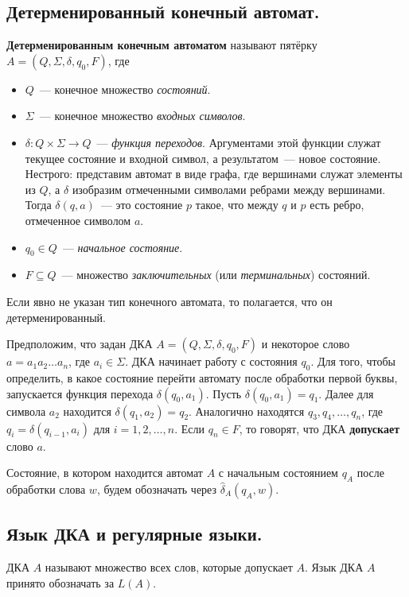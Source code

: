 \documentclass[a4paper,12pt]{article}
\begin{document}
	\subsection{Детерменированный конечный автомат.}
	\textbf{Детерменированным конечным автоматом} называют пятёрку \(A = (Q, \Sigma, \delta, q_0, F)\), где 
	\begin{itemize}
		\item \(Q\)~--- конечное множество \textit{состояний}.
		\item \(\Sigma\)~--- конечное множество \textit{входных символов}.
		\item \(\delta : Q \times \Sigma \to Q\)~--- \textit{функция переходов}. Аргументами этой функции служат текущее состояние и входной символ, а результатом~--- новое состояние. Нестрого: представим автомат в виде графа, где вершинами служат элементы из \(Q\), а \(\delta\) изобразим отмеченными символами ребрами между вершинами. Тогда \(\delta(q, a)\)~--- это состояние \(p\) такое, что между \(q\) и \(p\) есть ребро, отмеченное символом \(a\).
		\item \(q_0 \in Q\)~--- \textit{начальное состояние}.
		\item \(F \subseteq Q\)~--- множество \textit{заключительных} (или \textit{терминальных}) состояний.
	\end{itemize}
	Если явно не указан тип конечного автомата, то полагается, что он детерменированный.
	
	Предположим, что задан ДКА \(A = (Q, \Sigma, \delta, q_0, F)\) и некоторое слово \(a = a_1 a_2 \ldots a_n\), где \(a_i \in \Sigma\). ДКА начинает работу с состояния \(q_0\). Для того, чтобы определить, в какое состояние перейти автомату после обработки первой буквы, запускается функция перехода \(\delta(q_0, a_1)\). Пусть \(\delta(q_0, a_1) = q_1\). Далее для символа \(a_2\) находится \(\delta(q_1, a_2) = q_2\). Аналогично находятся \(q_3, q_4, \ldots, q_n\), где \(q_i = \delta(q_{i - 1}, a_i)\)  для \(i = 1, 2, \ldots, n\). Если \(q_n \in F\), то говорят, что ДКА \textbf{допускает} слово \(a\).
	
	Состояние, в котором находится автомат \(A\) с начальным состоянием \(q_A\) после обработки слова \(w\), будем обозначать через \(\hat{\delta}_A(q_A, w)\).
	
	 \subsection{Язык ДКА и регулярные языки.}
	  ДКА \(A\) называют множество всех слов, которые допускает \(A\). Язык ДКА \(A\) принято обозначать за \(L(A)\).
	 
\end{document}
